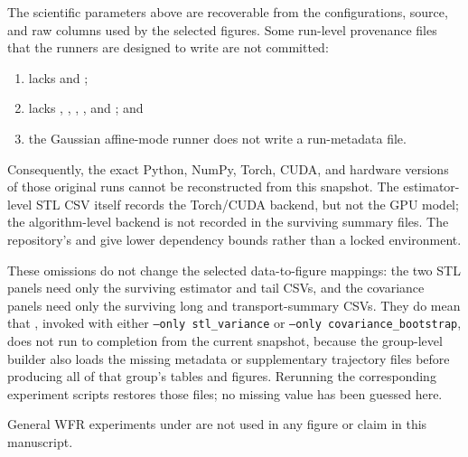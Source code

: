 \begingroup\small\raggedright
The scientific parameters above are recoverable from the configurations,
source, and raw columns used by the selected figures.  Some run-level
provenance files that the runners are designed to write are not committed:
\begin{enumerate}[label=(\roman*)]
  \item {} lacks
   and ;
  \item {} lacks
  , ,
  , , and
  ; and
  \item the Gaussian affine-mode runner does not write a run-metadata file.
\end{enumerate}
Consequently, the exact Python, NumPy, Torch, CUDA, and hardware versions of
those original runs cannot be reconstructed from this snapshot.  The
estimator-level STL CSV itself records the Torch/CUDA backend, but not the GPU
model; the algorithm-level backend is not recorded in the surviving summary
files.  The repository's  and
 give lower dependency bounds rather than a locked
environment.

These omissions do not change the selected data-to-figure mappings: the two
STL panels need only the surviving estimator and tail CSVs, and the covariance
panels need only the surviving long and transport-summary CSVs.  They do mean
that , invoked with either
\texttt{--only stl\_variance} or
\texttt{--only covariance\_bootstrap}, does not run to completion from the
current snapshot, because the group-level builder also loads the missing
metadata or supplementary trajectory files before producing all of that
group's tables and figures.  Rerunning the corresponding experiment scripts
restores those files; no missing value has been guessed here.

General WFR experiments under  are not used in
any figure or claim in this manuscript.
\par\endgroup

